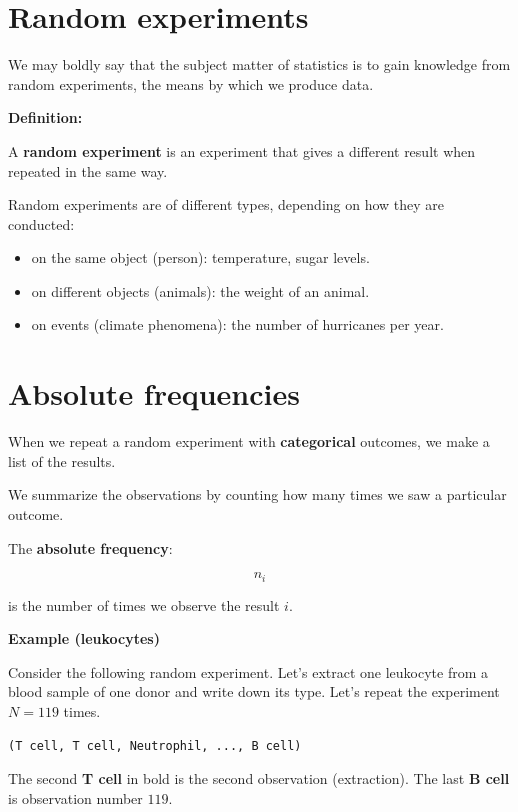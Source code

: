\documentclass[
]{book}
\providecommand{\tightlist}{%
  \setlength{\itemsep}{0pt}\setlength{\parskip}{0pt}}
\begin{document}
\hypertarget{random-experiments}{%
\section{Random experiments}\label{random-experiments}}

We may boldly say that the subject matter of statistics is to gain knowledge from random experiments, the means by which we produce data.

\textbf{Definition:}

A \textbf{random experiment} is an experiment that gives a different result when repeated in the same way.

Random experiments are of different types, depending on how they are conducted:

\begin{itemize}
\tightlist
\item
  on the same object (person): temperature, sugar levels.
\item
  on different objects (animals): the weight of an animal.
\item
  on events (climate phenomena): the number of hurricanes per year.
\end{itemize}

\hypertarget{absolute-frequencies}{%
\section{Absolute frequencies}\label{absolute-frequencies}}

When we repeat a random experiment with \textbf{categorical} outcomes, we make a list of the results.

We summarize the observations by counting how many times we saw a particular outcome.

The \textbf{absolute frequency}:

\[n_i\]

is the number of times we observe the result \(i\).

\textbf{Example (leukocytes)}

Consider the following random experiment. Let's extract one leukocyte from a blood sample of one donor and write down its type. Let's repeat the experiment \(N=119\) times.

\begin{verbatim}
(T cell, T cell, Neutrophil, ..., B cell)
\end{verbatim}

The second \textbf{T cell} in bold is the second observation (extraction). The last \textbf{B cell} is observation number \(119\).
\end{document}
